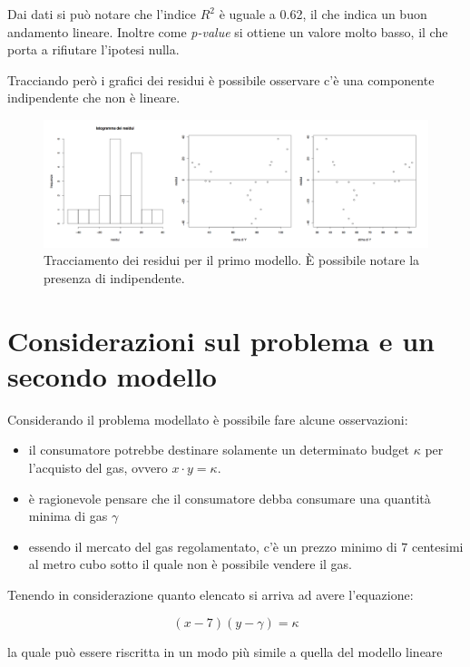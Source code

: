 Dai dati si può notare che l'indice $ R^2 $ è uguale a 0.62, il che indica un buon andamento lineare.
Inoltre come \textit{p-value} si ottiene un valore molto basso, il che porta a rifiutare l'ipotesi nulla.

Tracciando però i grafici dei residui è possibile osservare c'è una componente indipendente che non è lineare.

\begin{figure}[htbp]
	\centering
	\includegraphics[width=1\textwidth]{./notes/immagini/l7-fig2.png}
	\caption{Tracciamento dei residui per il primo modello. \`{E} possibile notare la presenza di indipendente.}
\end{figure}

\section{Considerazioni sul problema e un secondo modello}\label{considerazioni-sul-problema-e-un-secondo-modello}

Considerando il problema modellato è possibile fare alcune osservazioni:

\begin{itemize}
	\item il consumatore potrebbe destinare solamente un determinato budget $ \kappa $ per l'acquisto del gas, ovvero $ x \cdot y = \kappa $.
	\item è ragionevole pensare che il consumatore debba consumare una quantità minima di gas $ \gamma $
	\item essendo il mercato del gas regolamentato, c'è un prezzo minimo di $ 7 $ centesimi al metro cubo sotto il quale non è possibile vendere il gas.
\end{itemize}

Tenendo in considerazione quanto elencato si arriva ad avere l'equazione:

$$
(x-7)(y-\gamma) = \kappa
$$

la quale può essere riscritta in un modo più simile a quella del modello lineare

